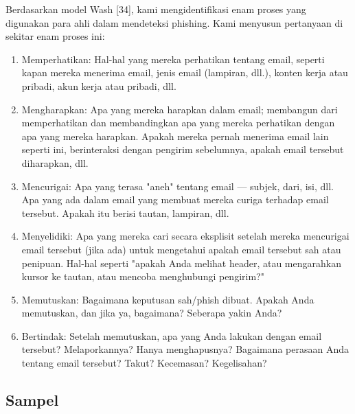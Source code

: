 \documentclass[lettersize,journal]{IEEEtran}
\begin{document}
Berdasarkan model Wash [34], kami mengidentifikasi enam
proses yang digunakan para ahli dalam mendeteksi phishing. Kami menyusun
pertanyaan di sekitar enam proses ini:

\begin{enumerate}
  \item{Memperhatikan}: Hal-hal yang mereka perhatikan tentang email, seperti kapan mereka menerima email, jenis email (lampiran, dll.), konten kerja atau pribadi, akun kerja atau pribadi, dll.
  \item{Mengharapkan}: Apa yang mereka harapkan dalam email; membangun dari memperhatikan dan membandingkan apa yang mereka perhatikan dengan apa yang mereka harapkan. Apakah mereka pernah menerima email lain seperti ini, berinteraksi dengan pengirim sebelumnya, apakah email tersebut diharapkan, dll.
  \item{Mencurigai}: Apa yang terasa "aneh" tentang email — subjek, dari, isi, dll. Apa yang ada dalam email yang membuat mereka curiga terhadap email tersebut. Apakah itu berisi tautan, lampiran, dll.
  \item{Menyelidiki}: Apa yang mereka cari secara eksplisit setelah mereka mencurigai email tersebut (jika ada) untuk mengetahui apakah email tersebut sah atau penipuan. Hal-hal seperti "apakah Anda melihat header, atau mengarahkan kursor ke tautan, atau mencoba menghubungi pengirim?"
  \item{Memutuskan}: Bagaimana keputusan sah/phish dibuat. Apakah Anda memutuskan, dan jika ya, bagaimana? Seberapa yakin Anda?
  \item{Bertindak}: Setelah memutuskan, apa yang Anda lakukan dengan email tersebut? Melaporkannya? Hanya menghapusnya? Bagaimana perasaan Anda tentang email tersebut? Takut? Kecemasan? Kegelisahan?
\end{enumerate}

\subsection{Sampel}
\end{document}
